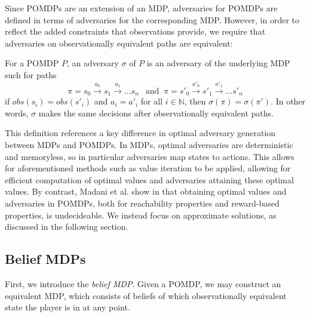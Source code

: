 Since POMDPs are an extension of an MDP, adversaries for POMDPs are defined in terms of adversaries for the corresponding MDP. However, in order to reflect the added constraints that observations provide, we require that adversaries on observationally equivalent paths are equivalent:

\begin{definition}
\label{cs1:pomdp_strats}

For a POMDP $P$, an adversary $\sigma$ of $P$ %
is an adversary of the underlying MDP such for paths
\[
\pi = s_0 \xrightarrow{a_0} s_1 \xrightarrow{a_1} \dots s_n \;\;\ \mbox{and} \;\; \pi = s'_0 \xrightarrow{a'_0} s'_1 \xrightarrow{a'_1} \dots s'_n
\]
if $obs(s_i) = obs(s'_i)$ and $a_i = a'_i$ for all $i \in \mathbb{N}$, then $\sigma(\pi) = \sigma(\pi')$. In other words, $\sigma$ makes the same decisions after observationally equivalent paths.

\end{definition}

This definition references a key difference in optimal adversary generation between MDPs and POMDPs. In MDPs, optimal adversaries are deterministic and memoryless, so in particular adversaries map states to actions. This allows for aforementioned methods such as value iteration to be applied, allowing for efficient computation of optimal values and adversaries attaining these optimal values. By contrast, Madani et al. show in \cite{madani_undecidability_2003} that obtaining optimal values and adversaries in POMDPs, both for reachability properties and reward-based properties, is undecideable. We instead focus on approximate solutions, as discussed in the following section.

\subsection{Belief MDPs}

First, we introduce the \emph{belief MDP}. Given a POMDP, we may construct an equivalent MDP, which consists of beliefs of which observationally equivalent state the player is in at any point.

